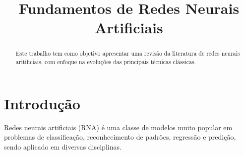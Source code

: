 \documentclass[conference]{IEEEtran}
\begin{document}
	
	\title{Fundamentos de Redes Neurais Artificiais}
	
	
	\author{
		}
	
	
	
	\maketitle
	
	\begin{abstract}
		Este trabalho tem como objetivo apresentar uma revisão da literatura de redes neurais aritificiais, com enfoque na evoluções das principais técnicas clássicas. 
	\end{abstract}

	\section{Introdução}
	Redes neurais artificiais (RNA) é uma classe de modelos muito popular em problemas de classificação, reconhecimento de padrões, regressão e predição, sendo aplicado em diversas disciplinas.
	
\end{document}
